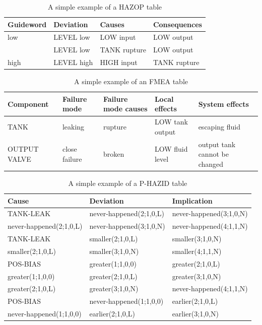 \documentclass[conference]{IEEEtran}
\begin{document}
\begin{table}
\label{tab:ehazop}
\caption{A simple example of a HAZOP table}
\begin{tabular}{|l|l|l|l|}
\hline
Guideword & Deviation & Causes & Consequences \\
\hline
\hline
low & LEVEL low & LOW input & LOW output \\
& LEVEL low & TANK rupture & LOW output \\
\hline
high & LEVEL high & HIGH input & TANK rupture \\
\hline
\end{tabular}
\end{table}

\begin{table}
\centering
\label{tab:efmea}
\caption{A simple example of an FMEA table}
\begin{tabular}{|l|l|l|l|l|}
\hline
Component & Failure mode & Failure mode causes & Local effects & System effects \\
\hline
\hline
TANK & leaking & rupture & LOW tank output & escaping fluid \\
\hline
OUTPUT VALVE & close failure & broken & LOW fluid level & output tank cannot be changed \\
\hline
\end{tabular}
\end{table}

\begin{table}
\centering
\label{tab:eprochazid}
\caption{A simple example of a P-HAZID table}
\begin{tabular}{|l|l|l|}
\hline
Cause & Deviation & Implication \\
\hline
\hline
TANK-LEAK & never-happened(2;1,0,L) & never-happened(3;1,0,N) \\
\hline
never-happened(2;1,0,L) & never-happened(3;1,0,N) & never-happened(4;1,1,N) \\
\hline
TANK-LEAK & smaller(2;1,0,L) & smaller(3;1,0,N) \\
\hline
smaller(2;1,0,L) & smaller(3;1,0,N) & smaller(4;1,1,N) \\
\hline
POS-BIAS & greater(1;1,0,0) & greater(2;1,0,L) \\
\hline
greater(1;1,0,0) & greater(2;1,0,L) & greater(3;1,0,N) \\
\hline
greater(2;1,0,L) & greater(3;1,0,N) & never-happened(4;1,1,N) \\
\hline
POS-BIAS& never-happened(1;1,0,0) & earlier(2;1,0,L) \\
\hline
never-happened(1;1,0,0) & earlier(2;1,0,L) & earlier(3;1,0,N) \\
\hline
\end{tabular}
\end{table}
\end{document}
